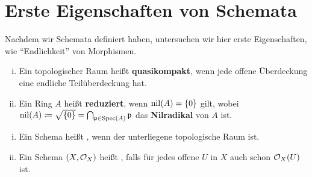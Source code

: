 
\chapter{Erste Eigenschaften von Schemata}
\label{chap:6}

Nachdem wir Schemata definiert haben, untersuchen wir hier erste Eigenschaften, wie \enquote{Endlichkeit} von Morphismen.

\begin{eri}
\label{eri:6.1}
	\begin{enumerate}[i)]
		\item Ein topologischer Raum heißt \textbf{quasikompakt}, wenn jede offene Überdeckung eine endliche Teilüberdeckung hat.
		\item Ein Ring $A$ heißt \textbf{reduziert}, wenn $\operatorname{nil}(A) = \{0\}$ gilt, wobei $\operatorname{nil}(A) \coloneqq \sqrt{\{0\}} = \bigcap_{\mathfrak{p} \in \operatorname{Spec}(A)} \mathfrak{p}$ das \textbf{Nilradikal} von $A$ ist.
	\end{enumerate}
\end{eri}

\begin{defn}
\label{defn:6.2}
	\begin{enumerate}[i)]
		\item Ein Schema heißt
		,
		wenn der unterliegene topologische Raum
		ist.
		\item Ein Schema $(X, \mathcal{O}_X)$ heißt
		,
		falls für jedes offene $U$ in $X$ auch schon $\mathcal{O}_X(U)$
		ist.
	\end{enumerate}
\end{defn}

